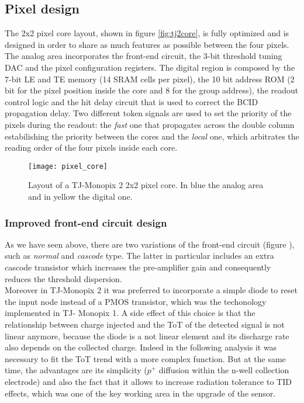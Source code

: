 
\subsection{Pixel design}

The 2x2 pixel core layout, shown in figure \vref{fig:tj2core}, is fully optimized and is designed in order to share as much features as possible between the four pixels. The analog area incorporates the front-end circuit, the 3-bit threshold tuning DAC and the pixel configuration registers. The digital region is composed by the 7-bit LE and TE memory (14 SRAM cells per pixel), the 10 bit address ROM (2 bit for the pixel position inside the core and 8 for the group address), the readout control logic and the hit delay circuit that is used to correct the BCID propagation delay. Two different token signals are used to set the priority of the pixels during the readout: the \textit{fast} one that propagates across the double column estabilishing the priority between the cores and the \textit{local} one, which arbitrates the reading order of the four pixels inside each core.

\begin{figure}[h!]
\centering
\texttt{[image: pixel\_core]}
\caption{Layout of a TJ-Monopix 2 2x2 pixel core. In blue the analog area and in yellow the digital one.}
\label{fig:tj2core}
\end{figure}



\subsubsection{Improved front-end circuit design}\label{improved_circuit}

As we have seen above, there are two variations of the front-end circuit (figure ), such as \textit{normal} and \textit{cascode} type. The latter in particular includes an extra cascode transistor which increases the pre-amplifier gain and consequently reduces the threshold dispersion.\\
Moreover in TJ-Monopix 2 it was preferred to incorporate a simple diode to reset the input node instead of a PMOS transistor, which was the techonology implemented in TJ- Monopix 1. A side effect of this choice is that the relationship between charge injected and the ToT of the detected signal is not linear anymore, because the diode is a not linear element and its discharge rate also depends on the collected charge. Indeed in the following analysis it was necessary to fit the ToT trend with a more complex function. But at the same time, the advantages are its simplicity ($p^{+}$ diffusion within the n-well collection electrode) and also the fact that it allows to increase radiation tolerance to TID effects, which was one of the key working area in the upgrade of the sensor.

